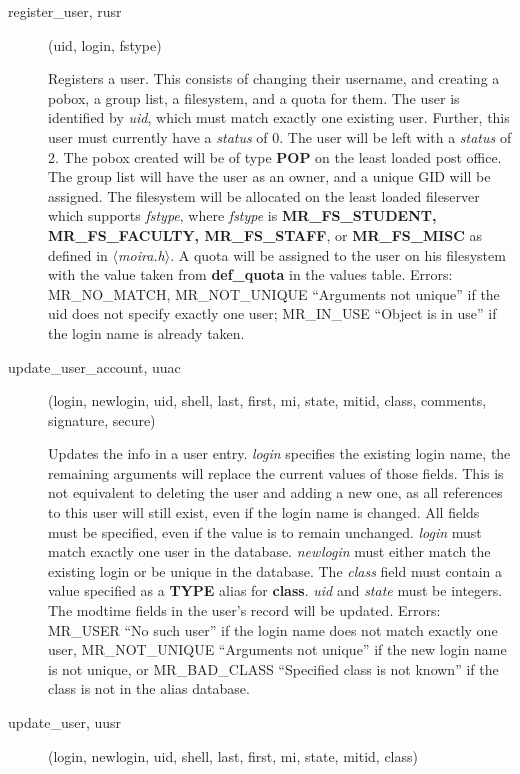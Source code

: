 \documentclass{article}
\begin{document}
\begin{description}
\item[register\_user, rusr](uid, login, fstype)

Registers a user. This consists of changing their username, and
creating a pobox, a group list, a filesystem, and a quota for them.
The user is identified by {\em uid}, which must match exactly one
existing user. Further, this user must currently have a {\em status}
of 0. The user will be left with a {\em status} of 2. The pobox
created will be of type {\bf POP} on the least loaded post office. The
group list will have the user as an owner, and a unique GID will be
assigned. The filesystem will be allocated on the least loaded
fileserver which supports {\em fstype}, where {\em fstype} is {\bf
MR\_FS\_STUDENT, MR\_FS\_FACULTY, MR\_FS\_STAFF}, or {\bf MR\_FS\_MISC} as
defined in {\em $\langle$moira.h$\rangle$}. A quota will be assigned
to the user on his filesystem with the value taken from {\bf
def\_quota} in the values table. Errors: MR\_NO\_MATCH, MR\_NOT\_UNIQUE
``Arguments not unique'' if the uid does not specify exactly one user;
MR\_IN\_USE ``Object is in use'' if the login name is already taken.

\item[update\_user\_account, uuac](login, newlogin, uid, shell, last,
first, mi, state, mitid, class, comments, signature, secure)

Updates the info in a user entry.  {\em login} specifies the existing
login name, the remaining arguments will replace the current values
of those fields.  This is not equivalent to deleting the user and
adding a new one, as all references to this user will still exist,
even if the login name is changed.  All fields must be specified, even
if the value is to remain unchanged.  {\em login} must match exactly one
user in the database.  {\em newlogin} must either match the existing
login or be unique in the database.  The {\em class} field must contain
a value specified as a {\bf TYPE} alias for {\bf class}.  {\em uid} and
{\em state} must be integers.  The modtime fields in the user's record
will be updated.  Errors: MR\_USER ``No such user'' if the login name
does not match exactly one user, MR\_NOT\_UNIQUE ``Arguments not unique''
if the new login name is not unique, or MR\_BAD\_CLASS ``Specified class
is not known'' if the class is not in the alias database.

\item[update\_user, uusr](login, newlogin, uid, shell, last, first, mi, state,
mitid, class)


\end{description}
\end{document}
